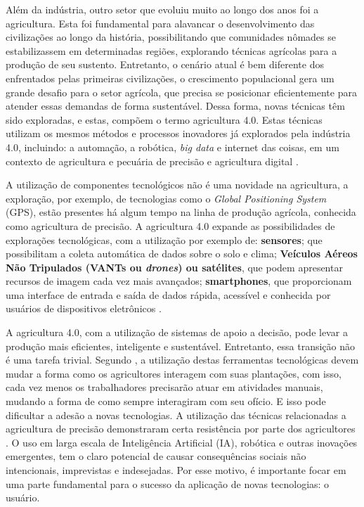 \documentclass[12pt]{article}
\begin{document}
Além da indústria, outro setor que evoluiu muito ao longo dos anos foi a agricultura. Esta foi fundamental para alavancar o desenvolvimento das civilizações ao longo da história, possibilitando que comunidades nômades se estabilizassem em determinadas regiões, explorando técnicas agrícolas para a produção de seu sustento. Entretanto, o cenário atual é bem diferente dos enfrentados pelas primeiras civilizações, o crescimento populacional gera um grande desafio para o setor agrícola, que precisa se posicionar eficientemente para atender essas demandas de forma sustentável. Dessa forma, novas técnicas têm sido exploradas, e estas, compõem o termo agricultura 4.0. Estas técnicas utilizam os mesmos métodos e processos inovadores já explorados pela indústria 4.0, incluindo: a automação, a robótica, \textit{big data} e internet das coisas, em um contexto de agricultura e pecuária de precisão e agricultura digital \cite{Ribeiro:2018}.

A utilização de componentes tecnológicos não é uma novidade na agricultura, a exploração, por exemplo, de tecnologias como o \textit{Global Positioning System} (GPS), estão presentes há algum tempo na linha de produção agrícola, conhecida como agricultura de precisão. A agricultura 4.0 expande as possibilidades de explorações tecnológicas, com a utilização por exemplo de: \textbf{sensores}; que possibilitam a coleta automática de dados sobre o solo e clima; \textbf{Veículos Aéreos Não Tripulados (VANTs ou \textit{drones}) ou satélites}, que podem apresentar recursos de imagem cada vez mais avançados; \textbf{smartphones}, que proporcionam uma interface de entrada e saída de dados rápida, acessível e conhecida por usuários de dispositivos eletrônicos \cite{Shepherd:2018}.

A agricultura 4.0, com a utilização de sistemas de apoio a decisão, pode levar a produção mais eficientes, inteligente e sustentável. Entretanto, essa transição não é uma tarefa trivial. Segundo , a utilização destas ferramentas tecnológicas devem mudar a forma como os agricultores interagem com suas plantações, com isso, cada vez menos os trabalhadores precisarão atuar em atividades manuais, mudando a forma de como sempre interagiram com seu ofício. E isso pode dificultar a adesão a novas tecnologias. A utilização das técnicas relacionadas a agricultura de precisão demonstraram certa resistência por parte dos agricultores \cite{Rose:2019}. O uso em larga escala de Inteligência Artificial (IA), robótica e outras inovações emergentes, tem o claro potencial de causar consequências sociais não intencionais, imprevistas e indesejadas. Por esse motivo, é importante focar em uma parte fundamental para o sucesso da aplicação de novas tecnologias: o usuário.
\end{document}
